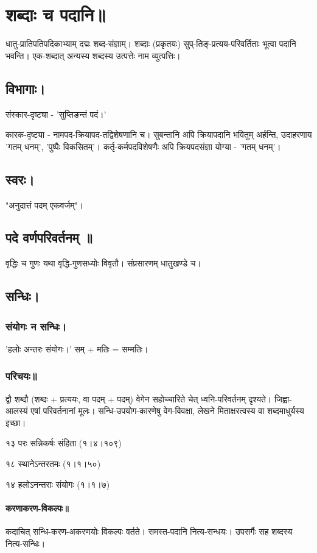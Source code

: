 \documentclass[oneside, article]{memoir}
\begin{document}
\chapter{शब्दाः च पदानि॥}
धातु-प्रातिपतिपदिकाभ्याम् दद्मः शब्द-संज्ञाम्। शब्दाः (प्रकृतयः) सुप्-तिङ्-प्रत्यय-परिवर्तिताः भूत्वा पदानि भवन्ति। एक-शब्दात् अन्यस्य शब्दस्य उत्पत्तेः नाम व्युत्पत्तिः।

\section{विभागाः।}
संस्कार-दृष्ट्या - 'सुप्तिङन्तं पदं।'

कारक-दृष्ट्या - नामपद-क्रियापद-तद्विशेषणानि च। सुबन्तानि अपि क्रियापदानि भवितुम् अर्हन्ति, उदाहरणाय 'गतम् धनम्', 'पुष्पैः विकसितम्'। कर्तृ-कर्मपदविशेषणैः अपि क्रियपदसंज्ञा योग्या  - 'गतम् धनम्'।

\section{स्वरः।}
"अनुदात्तं पदम् एकवर्जम्"।

\section{पदे वर्णपरिवर्तनम् ॥}
वृद्धिः च गुणः यथा वृद्धि-गुणसध्योः विवृतौ। संप्रसारणम् धातुखण्डे च।

\section{सन्धिः।}
\subsection{संयोगः न सन्धिः।}
'हलोः अन्तरः संयोगः।' सम् + मतिः = सम्मतिः।

\subsection{परिचयः॥}
द्वौ शब्दौ (शब्दः + प्रत्ययः, वा पदम् + पदम्) वेगेन सहोच्चारिते चेत् ध्वनि-परिवर्तनम् दृश्यते। जिह्वा-आलस्यं एषां परिवर्तनानां मूलः। सन्धि-उपयोग-कारणेषु वेग-विवक्षा, लेखने मिताक्षरत्वस्य वा शब्दमाधुर्यस्य इच्छा।

१३ परः सन्निकर्षः संहिता (१।४।१०९) 

१८ स्थानेऽन्तरतमः (१।१।५०)

१४ हलोऽनन्तराः संयोगः (१।१।७) 

\subsubsection{करणाकरण-विकल्पः॥}
कदाचित् सन्धि-करण-अकरणयोः विकल्पः वर्तते। समस्त-पदानि नित्य-सन्धयः। उपसर्गैः सह शब्दस्य नित्य-सन्धिः।
\end{document}
